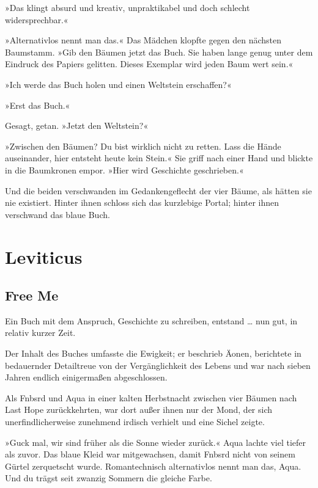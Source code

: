 »Das klingt absurd und kreativ, unpraktikabel und doch schlecht widersprechbar.«

»Alternativlos nennt man das.« Das Mädchen klopfte gegen den nächsten Baumstamm. »Gib den Bäumen jetzt das Buch. Sie haben lange genug unter dem Eindruck des Papiers gelitten. Dieses Exemplar wird jeden Baum wert sein.«

»Ich werde das Buch holen und einen Weltstein erschaffen?«

»Erst das Buch.«

Gesagt, getan. »Jetzt den Weltstein?«

»Zwischen den Bäumen? Du bist wirklich nicht zu retten. Lass die Hände auseinander, hier entsteht heute kein Stein.« Sie griff nach einer Hand und blickte in die Baumkronen empor. »Hier wird Geschichte geschrieben.«

Und die beiden verschwanden im Gedankengeflecht der vier Bäume, als hätten sie nie existiert. Hinter ihnen schloss sich das kurzlebige Portal; hinter ihnen verschwand das blaue Buch.

\cleardoubleevenpage




\part{Leviticus}

\chapter{Free Me}

Ein Buch mit dem Anspruch, Geschichte zu schreiben, entstand … nun gut, in relativ kurzer Zeit.

Der Inhalt des Buches umfasste die Ewigkeit; er beschrieb Äonen, berichtete in bedauernder Detailtreue von der Vergänglichkeit des Lebens und war nach sieben Jahren endlich einigermaßen abgeschlossen.

Als Fnbsrd und Aqua in einer kalten Herbstnacht zwischen vier Bäumen nach Last Hope zurückkehrten, war dort außer ihnen nur der Mond, der sich unerfindlicherweise zunehmend irdisch verhielt und eine Sichel zeigte.

»Guck mal, wir sind früher als die Sonne wieder zurück.« Aqua lachte viel tiefer als zuvor. Das blaue Kleid war mitgewachsen, damit Fnbsrd nicht von seinem Gürtel zerquetscht wurde. Romantechnisch alternativlos nennt man das, Aqua. Und du trägst seit zwanzig Sommern die gleiche Farbe.

